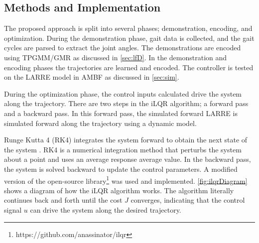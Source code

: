 \subsection{Methods and Implementation}

The proposed approach is split into several phases; demonstration, encoding, and optimization. During the demonstration phase, gait data is collected, and the gait cycles are parsed to extract the joint angles. The demonstrations are encoded using TPGMM/GMR as discussed in \autoref{sec:lfD}. In the demonstration and encoding phases the trajectories are learned and encoded. The controller is tested on the LARRE model in AMBF as discussed in \autoref{sec:sim}. 

During the optimization phase, the control inputs calculated drive the system along the trajectory. There are two steps in the iLQR algorithm; a forward pass and a backward pass. In this forward pass, the simulated forward LARRE is simulated forward along the trajectory using a dynamic model. 

Runge Kutta 4 (RK4) integrates the system forward to obtain the next state of the system \cite{dit2017runge}. RK4 is a numerical integration method that perturbs the system about a point and uses an average response average value.  In the backward pass, the system is solved backward to update the control parameters. A modified version of the open-source library\footnote{https://github.com/anassinator/ilqr} was used and implemented.  \autoref{fig:ilqrDiagram} shows a diagram of how the iLQR algorithm works. The algorithm literally continues back and forth until the cost $J$ converges, indicating that the control signal $u$ can drive the system along the desired trajectory. 

